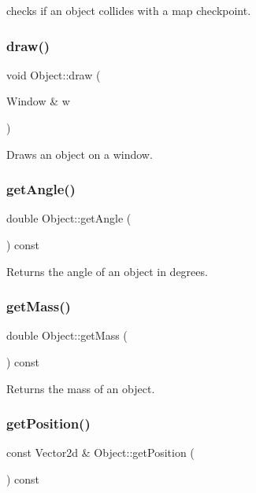checks if an object collides with a map checkpoint. \hypertarget{classObject_a4da149ed27dfef04d62cb2fa6315af1c}{}\label{classObject_a4da149ed27dfef04d62cb2fa6315af1c} 
\subsubsection{\texorpdfstring{draw()}{draw()}}
{\footnotesize\ttfamily void Object\+::draw (\begin{DoxyParamCaption}\item[{Window \&}]{w }\end{DoxyParamCaption})}

Draws an object on a window. \hypertarget{classObject_a9958ed5111be9373ef97cb20d00b625f}{}\label{classObject_a9958ed5111be9373ef97cb20d00b625f} 
\subsubsection{\texorpdfstring{get\+Angle()}{getAngle()}}
{\footnotesize\ttfamily double Object\+::get\+Angle (\begin{DoxyParamCaption}{ }\end{DoxyParamCaption}) const}

Returns the angle of an object in degrees. \hypertarget{classObject_ac53341c11f7435033434bc3b6c908f0c}{}\label{classObject_ac53341c11f7435033434bc3b6c908f0c} 
\subsubsection{\texorpdfstring{get\+Mass()}{getMass()}}
{\footnotesize\ttfamily double Object\+::get\+Mass (\begin{DoxyParamCaption}{ }\end{DoxyParamCaption}) const}

Returns the mass of an object. \hypertarget{classObject_ab498ce65ce8cb69bb806081e65f19cd6}{}\label{classObject_ab498ce65ce8cb69bb806081e65f19cd6} 
\subsubsection{\texorpdfstring{get\+Position()}{getPosition()}}
{\footnotesize\ttfamily const Vector2d \& Object\+::get\+Position (\begin{DoxyParamCaption}{ }\end{DoxyParamCaption}) const}

